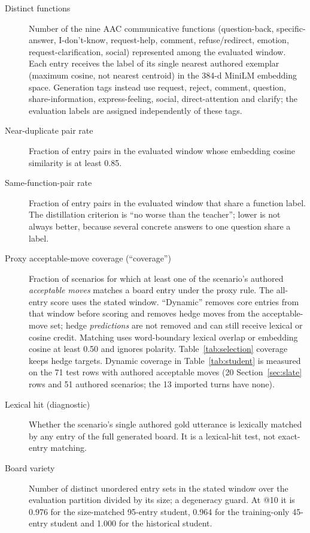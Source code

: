 \begin{description}
\item[Distinct functions] Number of the nine AAC communicative functions
(question-back, specific-answer, I-don't-know, request-help, comment,
refuse/redirect, emotion, request-clarification, social) represented among the
evaluated window. Each entry receives the label of its single nearest authored exemplar (maximum cosine, not nearest centroid) in the 384-d MiniLM embedding space. Generation tags instead use request, reject, comment, question, share-information, express-feeling, social, direct-attention and clarify; the evaluation labels are assigned independently of these tags.
\item[Near-duplicate pair rate] Fraction of entry pairs in the evaluated window whose embedding cosine similarity is at least 0.85.
\item[Same-function-pair rate] Fraction of entry pairs in the evaluated window that
share a function label. The distillation criterion is ``no worse than the teacher''; lower is not always better, because several concrete answers to one question share a label.
\item[Proxy acceptable-move coverage (``coverage'')] Fraction of scenarios for which at least one of the
scenario's authored \emph{acceptable moves} matches a board entry under the proxy rule.
The all-entry score uses the stated window. ``Dynamic'' removes core entries from that window before scoring and removes hedge moves from the acceptable-move set; hedge \emph{predictions} are not removed and can still receive lexical or cosine credit. Matching uses word-boundary lexical overlap or embedding cosine at least 0.50 and ignores polarity. Table~\ref{tab:selection} coverage keeps hedge targets. Dynamic coverage in Table~\ref{tab:student} is measured on the 71 test rows with authored acceptable moves (20 Section~\ref{sec:slate} rows and 51 authored scenarios; the 13 imported turns have none).
\item[Lexical hit (diagnostic)] Whether the scenario's single authored gold utterance is lexically matched by any entry of the full generated board. It is a lexical-hit test, not exact-entry matching.
\item[Board variety] Number of distinct unordered entry sets in the stated window over the evaluation partition divided by its size; a degeneracy guard. At @10 it is 0.976 for the size-matched 95-entry student, 0.964 for the training-only 45-entry student and 1.000 for the historical student. %

\end{description}
